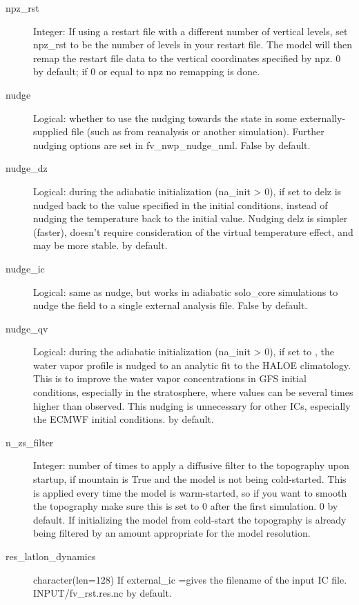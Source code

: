 \documentclass[12pt,letterpaper]{book}
\begin{document}
\begin{description}
\item[npz\_rst] Integer: If using a restart file with a different number of vertical levels, set npz\_rst to be the number of levels in your restart file. The model will then remap the restart file data to the vertical coordinates specified by npz. 
0 by default; if 0 or equal to npz no remapping is done. 


\item[nudge] Logical: whether to use the nudging towards the state in some externally-supplied file 
(such as from reanalysis or another simulation). Further nudging options are set in fv\_nwp\_nudge\_nml. False by default. 

\item[nudge\_dz] Logical: during the adiabatic initialization (na\_init > 0), if set to \true   delz is nudged back to the value specified in the initial conditions, instead of nudging the temperature back to the initial value. Nudging delz is simpler (faster), doesn't require consideration of the virtual temperature effect, and may be more stable. \false  by default.

\item[nudge\_ic] Logical: same as nudge, but works in adiabatic solo\_core simulations to nudge the field to a single external analysis file. False by default.

\item[nudge\_qv] Logical: during the adiabatic initialization (na\_init > 0), if set to \true , the water vapor profile is nudged to an analytic fit to the HALOE climatology. This is to improve the water vapor concentrations in GFS initial conditions, especially in the stratosphere, where values can be several times higher than observed. This nudging is unnecessary for other ICs, especially the ECMWF initial conditions. \false  by default. 

\item[n\_zs\_filter] Integer: number of times to apply a diffusive filter to the topography upon startup, if mountain is True and the model is not being cold-started. This is applied every time the model is warm-started, so if you want to smooth the topography make sure this is set to 
0 after the first simulation. 0 by default. If initializing the model from cold-start the topography is already being filtered by an amount appropriate for the model resolution. 


\item[res\_latlon\_dynamics] character(len=128) If external\_ic 
=\true  gives the filename of the input IC file. INPUT/fv\_rst.res.nc by default. 



\end{description}
\end{document}
